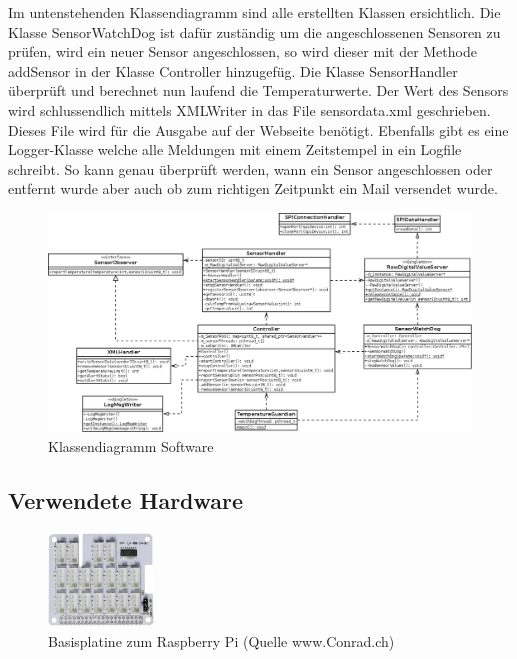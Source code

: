 Im untenstehenden Klassendiagramm sind alle erstellten Klassen ersichtlich.
Die Klasse SensorWatchDog ist dafür zuständig um die angeschlossenen Sensoren zu prüfen, wird ein neuer Sensor angeschlossen, so wird dieser mit der Methode addSensor in der Klasse Controller hinzugefüg. Die Klasse SensorHandler überprüft und berechnet nun laufend die Temperaturwerte. Der Wert des Sensors wird schlussendlich mittels XMLWriter in das File sensordata.xml geschrieben. Dieses File wird für die Ausgabe auf der Webseite benötigt.
Ebenfalls gibt es eine Logger-Klasse welche alle Meldungen mit einem Zeitstempel in ein Logfile schreibt. So kann genau überprüft werden, wann ein Sensor angeschlossen oder entfernt wurde aber auch ob zum richtigen Zeitpunkt ein Mail versendet wurde. 

\begin{figure}[H]%
\centering
\includegraphics[width=1\textwidth]{Images/Klassendiagramm.png}
\caption{Klassendiagramm Software}
\label{fig:classdia}
\end{figure}
\subsection{Verwendete Hardware}

\begin{figure}[H]%
\centering
\includegraphics[width=0.25\textwidth]{Images/Basisplatine.jpg}
\caption{Basisplatine zum Raspberry Pi (Quelle www.Conrad.ch)}
\label{fig:plate}
\end{figure}


